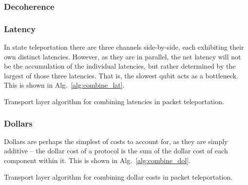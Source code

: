 \documentclass[aps,rmp,twocolumn,amsmath,amssymb,nofootinbib,superscriptaddress,longbibliography,floatfix,table-of-contents,eqsecnum]{revtex4-1}
\newcommand{\comment}[1]{{\color{blue}{\textbf{#1}}}}
\begin{document}
\comment{To do}

%
%

\subsubsection{Decoherence} 

\comment{To do}

%
%

\subsubsection{Latency} 

In state teleportation there are three channels side-by-side, each exhibiting their own distinct latencies. However, as they are in parallel, the net latency will not be the accumulation of the individual latencies, but rather determined by the largest of those three latencies. That is, the slowest qubit acts as a bottleneck. This is shown in Alg.~\ref{alg:combine_lat}.

\begin{table}[!htb]
\caption{Transport layer algorithm for combining latencies in packet teleportation.} \label{alg:combine_lat}
\end{table}

%
%

\subsubsection{Dollars} 

Dollars are perhaps the simplest of costs to account for, as they are simply additive -- the dollar cost of a protocol is the sum of the dollar cost of each component within it. This is shown in Alg.~\ref{alg:combine_dol}.

\begin{table}[!htb]
\caption{Transport layer algorithm for combining dollar costs in packet teleportation.} \label{alg:combine_dol}
\end{table}
\end{document}
